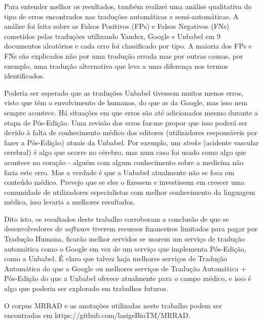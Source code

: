 \begin{abstractspt}
Para entender melhor os resultados, também realizei uma análise qualitativa do tipo de erros encontrados nas traduções automáticas e semi-automáticas. A análise foi feita sobre os Falsos Positivos (FPs) e Falsos Negativos (FNs) cometidos pelas traduções utilizando Yandex, Google e Unbabel em 9 documentos aleatórios e cada erro foi classificado por tipo. A maioria dos FPs e FNs são explicados não por uma tradução errada mas por outras causas, por exemplo, uma tradução alternativa que leva a uma diferença nos termos identificados. 

Poderia ser esperado que as traduções Unbabel tivessem muitos menos erros, visto que têm o envolvimento de humanos, do que as da Google, mas isso nem sempre acontece. Há situações em que erros são até adicionados mesmo durante a etapa de Pós-Edição. Uma revisão dos erros faz-me propor que isso poderá ser devido à falta de conhecimento médico dos editores (utilizadores responsáveis por fazer a Pós-Edição) atuais da Unbabel. Por exemplo, um \textit{stroke} (acidente vascular cerebral) é algo que ocorre no cérebro, mas num caso foi usado como algo que acontece no coração - alguém com algum conhecimento sobre a medicina não faria este erro. Mas a verdade é que a Unbabel atualmente não se foca em conteúdo médico. Prevejo que se eles o fizessem e investissem em crescer uma comunidade de utilizadores especialistas com melhor conhecimento da linguagem médica, isso levaria a melhores resultados.

Dito isto, os resultados deste trabalho corroboram a conclusão de que se desenvolvedores de \textit{software} tiverem recursos financeiros limitados para pagar por Tradução Humana, ficarão melhor servidos se usarem um serviço de tradução automática como o Google em vez de um serviço que implementa Pós-Edição, como a Unbabel. É claro que talvez haja melhores serviços de Tradução Automática do que a Google ou melhores serviços de Tradução Automática + Pós-Edição do que a Unbabel oferece atualmente para o campo médico, e isso é algo que poderia ser explorado em trabalhos futuros.

O corpus MRRAD e as anotações utilizadas neste trabalho podem ser encontradas em https://github.com/lasigeBioTM/MRRAD.

\end{abstractspt}

